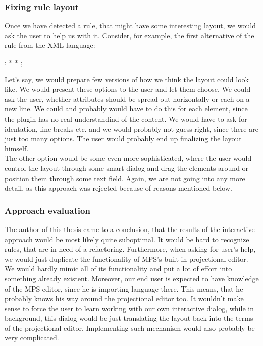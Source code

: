 \subsubsection{Fixing rule layout}

Once we have detected a rule, that might have some interesting layout, we would ask the user to help us with it.
Consider, for example, the first alternative of the  rule from the XML language:

\begin{antlr}
	  :   \literal{<}  * \literal{>} * \literal{</}  \literal{>} ;
\end{antlr}

Let's say, we would prepare few versions of how we think the layout could look like.
We would present these options to the user and let them choose.
We could ask the user, whether attributes should be spread out horizontally or each on a new line.
We could and probably would have to do this for each element, since the plugin has no real understandind of the content.
We would have to ask for identation, line breaks etc. and we would probably not guess right, since there are just too many options.
The user would probably end up finalizing the layout himself.
\\

The other option would be some even more sophisticated, where the user would control the layout through some smart dialog and drag the elements around or position them through some text field.
Again, we are not going into any more detail, as this approach was rejected because of reasons mentioned below.

\subsubsection{Approach evaluation}
\label{chap:interactive_approach_evaluation}

The author of this thesis came to a conclusion, that the results of the interactive approach would be most likely quite suboptimal.
It would be hard to recognize rules, that are in need of a refactoring.
Furthermore, when asking for user's help, we would just duplicate the functionality of MPS's built-in projectional editor.
We would hardly mimic all of its functionality and put a lot of effort into something already existent.
Moreover, our end user is expected to have knowledge of the MPS editor, since he is importing language there.
This means, that he probably knows his way around the projectional editor too.
It wouldn't make sense to force the user to learn working with our own interactive dialog, while in background, this dialog would be just translating the layout back into the terms of the projectional editor.
Implementing such mechanism would also probably be very complicated.

